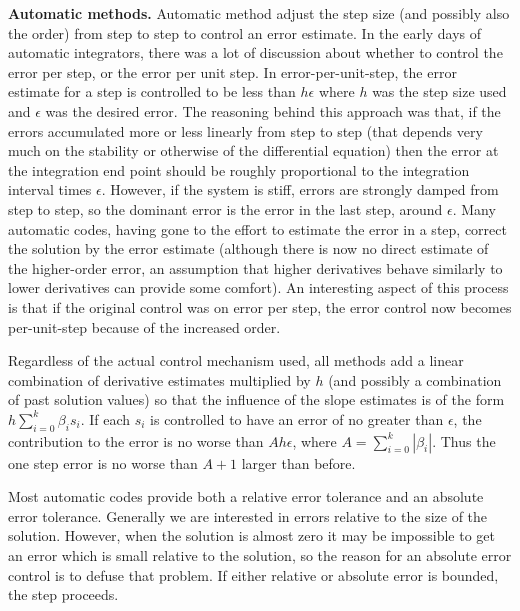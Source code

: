 \documentclass[numbers]{frontiersSCNS}
\DeclareRobustCommand{\outTstep}{h}
\begin{document}
\textbf{Automatic methods.} Automatic method adjust the step size (and possibly also the order)
from step to step to control an error estimate.  
%
In the early days of automatic integrators, there was a lot of discussion about 
whether to control the error per step, or the error per unit step.  
%
In error-per-unit-step, the error estimate for a step is controlled 
to be less than ${\outTstep}\epsilon$ where ${\outTstep}$ was the step size used and $\epsilon$ 
was the desired error. The reasoning behind this approach was that, 
if the errors accumulated more or less linearly from step to step 
(that depends very much on the stability or otherwise of the differential equation) 
then the error at the integration end point should be roughly proportional to the integration interval times $\epsilon$.  
%
However, if the system is stiff, errors are strongly damped from step to step, 
so the dominant error is the error in the last step, around $\epsilon$.  
%
Many automatic codes, having gone to the effort to estimate the error in a step, 
%
correct the solution by the error estimate (although there is now no direct estimate
of the higher-order error, an assumption 
that higher derivatives behave similarly to lower derivatives can provide some comfort).  
%
An interesting aspect of this process is that if the original control was on error per step, 
the error control now becomes per-unit-step because of the increased order.


Regardless of the actual control mechanism used,
all methods add a linear combination of derivative estimates multiplied by ${\outTstep}$
(and possibly a combination of past solution values)
so that the influence of the slope estimates is of the form
${\outTstep} \sum_{i=0}^k \beta_i s_i$.
%
If each $s_i$ is controlled to have an error of no greater than $\epsilon$, 
the contribution to the error is no worse than $A{\outTstep}\epsilon$, where $A = \sum_{i=0}^k |\beta_i|$.  
%
Thus the one step error is no worse than $A+1$ larger than before.

Most automatic codes provide both a relative error tolerance and an absolute error tolerance.  
%
Generally we are interested in errors relative to the size of the solution.  %
However, when the solution is almost zero it may be impossible to get an error 
which is small relative to the solution, 
so the reason for an absolute error control is to defuse that problem.  
%
If either relative or absolute error is bounded, the step proceeds.
\end{document}
